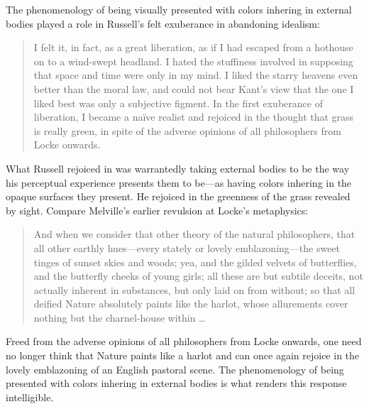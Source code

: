 \documentclass[12pt]{article}
\begin{document}
The phenomenology of being visually presented with colors inhering in external bodies played a role in Russell's felt exuberance in abandoning idealism:
\begin{quote}
	I felt it, in fact, as a great liberation, as if I had escaped from a hothouse on to a wind-swept headland. I hated the stuffiness involved in supposing that space and time were only in my mind. I liked the starry heavens even better than the moral law, and could not bear Kant’s view that the one I liked best was only a subjective figment. In the first exuberance of liberation, I became a naïve realist and rejoiced in the thought that grass is really green, in spite of the adverse opinions of all philosophers from Locke onwards.
\end{quote}
What Russell rejoiced in was warrantedly taking external bodies to be the way his perceptual experience presents them to be---as having colors inhering in the opaque surfaces they present. He rejoiced in the greenness of the grass revealed by sight. Compare Melville's earlier revulsion at Locke's metaphysics:
\begin{quote}
	And when we consider that other theory of the natural philosophers, that all other earthly hues---every stately or lovely emblazoning---the sweet tinges of sunset skies and woods; yea, and the gilded velvets of butterflies, and the butterfly cheeks of young girls; all these are but subtile deceits, not actually inherent in substances, but only laid on from without; so that all deified Nature absolutely paints like the harlot, whose allurements cover nothing but the charnel-house within \ldots\ 
\end{quote}
Freed from the adverse opinions of all philosophers from Locke onwards, one need no longer think that Nature paints like a harlot and can once again rejoice in the lovely emblazoning of an English pastoral scene. The phenomenology of being presented with colors inhering in external bodies is what renders this response intelligible.
\end{document}
